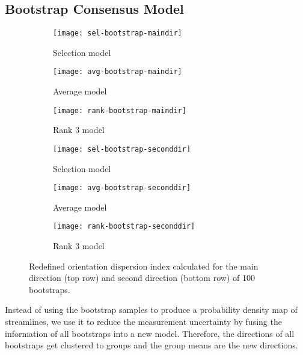 \subsection{Bootstrap Consensus Model}
\begin{figure*}[t]
	\centering
	\begin{subfigure}[b]{0.33\linewidth}
		\texttt{[image: sel-bootstrap-maindir]}
		\caption{Selection model}
	\end{subfigure}
	\begin{subfigure}[b]{0.33\linewidth}
		\texttt{[image: avg-bootstrap-maindir]}
		\caption{Average model}
	\end{subfigure}
	\begin{subfigure}[b]{0.33\linewidth}
		\texttt{[image: rank-bootstrap-maindir]}
		\caption{Rank 3 model}
	\end{subfigure}
	\begin{subfigure}[b]{0.33\linewidth}
		\texttt{[image: sel-bootstrap-seconddir]}
		\caption{Selection model}
		\label{fig:sel-bottom}
	\end{subfigure}
	\begin{subfigure}[b]{0.33\linewidth}
		\texttt{[image: avg-bootstrap-seconddir]}
		\caption{Average model}
	\end{subfigure}
	\begin{subfigure}[b]{0.33\linewidth}
		\texttt{[image: rank-bootstrap-seconddir]}
		\caption{Rank 3 model}
	\end{subfigure}
	\caption{Redefined orientation dispersion index calculated for the main
	direction (top row) and second direction (bottom row) of 100 bootstraps.}
	\label{fig:dispersion}
\end{figure*}


Instead of using the bootstrap samples to produce a probability density map of
streamlines, we use it to reduce the measurement uncertainty by fusing the
information of all bootstraps into a new model. 
Therefore, the directions of all bootstraps get clustered to groups and the
group means are the new directions.

